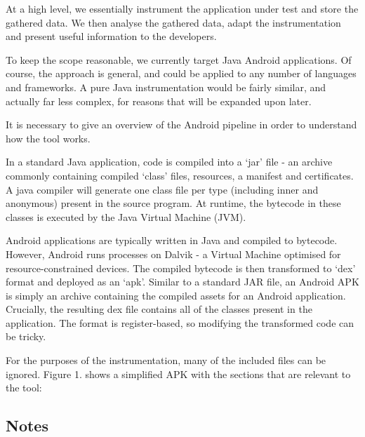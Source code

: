 
At a high level, we essentially instrument the application under test and store the gathered data. We then analyse the gathered data, adapt the instrumentation and present useful information to the developers.

To keep the scope reasonable, we currently target Java Android applications. Of course, the approach is general, and could be applied to any number of languages and frameworks. A pure Java instrumentation would be fairly similar, and actually far less complex, for reasons that will be expanded upon later.

It is necessary to give an overview of the Android pipeline in order to understand how the tool works.

In a standard Java application, code is compiled into a ‘jar’ file - an archive commonly containing compiled ‘class’ files, resources, a manifest and certificates. A java compiler will generate one class file per type (including inner and anonymous) present in the source program. At runtime, the bytecode in these classes is executed by the Java Virtual Machine (JVM).

Android applications are typically written in Java and compiled to bytecode. However, Android runs processes on Dalvik - a Virtual Machine optimised for resource-constrained devices. The compiled bytecode is then transformed to ‘dex’ format and deployed as an ‘apk’. Similar to a standard JAR file, an Android APK is simply an archive containing the compiled assets for an Android application. Crucially, the resulting dex file contains all of the classes present in the application. The format is register-based, so modifying the transformed code can be tricky.


For the purposes of the instrumentation, many of the included files can be ignored. Figure 1. shows a simplified APK with the sections that are relevant to the tool:


\subsection{Notes}


